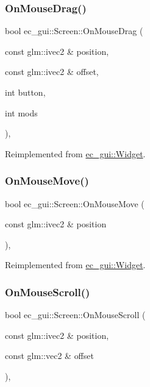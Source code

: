 \subsubsection{\texorpdfstring{On\+Mouse\+Drag()}{OnMouseDrag()}}
{\footnotesize\ttfamily bool ec\+\_\+gui\+::\+Screen\+::\+On\+Mouse\+Drag (\begin{DoxyParamCaption}\item[{const glm\+::ivec2 \&}]{position,  }\item[{const glm\+::ivec2 \&}]{offset,  }\item[{int}]{button,  }\item[{int}]{mods }\end{DoxyParamCaption})\hspace{0.3cm}{\ttfamily [override]}, {\ttfamily [virtual]}}



Reimplemented from \mbox{\hyperlink{classec__gui_1_1_widget_a1801c494e708ae6deb39386feb352f23}{ec\+\_\+gui\+::\+Widget}}.

\mbox{\label{classec__gui_1_1_screen_a22ba089bf993e921d2d9b8e26f620e52}} 
\subsubsection{\texorpdfstring{On\+Mouse\+Move()}{OnMouseMove()}}
{\footnotesize\ttfamily bool ec\+\_\+gui\+::\+Screen\+::\+On\+Mouse\+Move (\begin{DoxyParamCaption}\item[{const glm\+::ivec2 \&}]{position }\end{DoxyParamCaption})\hspace{0.3cm}{\ttfamily [override]}, {\ttfamily [virtual]}}



Reimplemented from \mbox{\hyperlink{classec__gui_1_1_widget_a8b4943212deb1a9774d119b0b09f9078}{ec\+\_\+gui\+::\+Widget}}.

\mbox{\label{classec__gui_1_1_screen_aff591b1b897b9237a3ab734689282c0e}} 
\subsubsection{\texorpdfstring{On\+Mouse\+Scroll()}{OnMouseScroll()}}
{\footnotesize\ttfamily bool ec\+\_\+gui\+::\+Screen\+::\+On\+Mouse\+Scroll (\begin{DoxyParamCaption}\item[{const glm\+::ivec2 \&}]{position,  }\item[{const glm\+::vec2 \&}]{offset }\end{DoxyParamCaption})\hspace{0.3cm}{\ttfamily [override]}, {\ttfamily [virtual]}}



